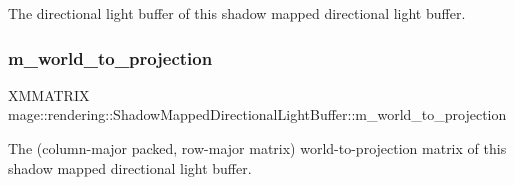 The directional light buffer of this shadow mapped directional light buffer. \hypertarget{structmage_1_1rendering_1_1_shadow_mapped_directional_light_buffer_a293c5a1f5ce4a21b713df0ea9a088750}{}\label{structmage_1_1rendering_1_1_shadow_mapped_directional_light_buffer_a293c5a1f5ce4a21b713df0ea9a088750} 
\subsubsection{\texorpdfstring{m\+\_\+world\+\_\+to\+\_\+projection}{m\_world\_to\_projection}}
{\footnotesize\ttfamily X\+M\+M\+A\+T\+R\+IX mage\+::rendering\+::\+Shadow\+Mapped\+Directional\+Light\+Buffer\+::m\+\_\+world\+\_\+to\+\_\+projection}

The (column-\/major packed, row-\/major matrix) world-\/to-\/projection matrix of this shadow mapped directional light buffer. 